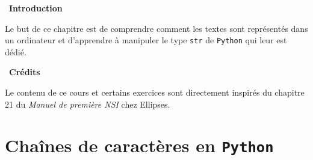 \documentclass[a4paper, french, 12pt]{article}  %
\newenvironment{introduction}
{\par \medskip    \noindent  
 \begin {bclogo}[couleur = blue!5 , arrondi =0.1,logo=\bcrosevents, marge=4] {~\textbf{Introduction}    }
 \par }
{
\end{bclogo}
 \par \bigskip }
\newcounter{cours}
\newenvironment{credit}
{\par \medskip   \noindent   
\begin{bclogo}[arrondi =0.1,  ombre = true, barre=zigzag, noborder = true, logo=\bcplume, marge=0]{~\textbf{Crédits} } \par \vspace{10pt}}
{ \itshape
\end{bclogo}
 \par \bigskip }
\begin{document}
\setlength{\parindent}{0cm}
\setlength{\columnseprule}{0cm}

\begin{center}
\end{center}

\vspace*{20pt}

\begin{introduction}{}
Le but de ce chapitre est de comprendre comment les textes sont représentés dans un ordinateur et d'apprendre à manipuler le type \lstinline{str} de \texttt{Python} qui leur est dédié.



\end{introduction}    

\vspace*{-20pt}

\begin{credit}

Le contenu de ce cours et certains exercices sont directement inspirés du chapitre 21 du  \emph{Manuel de première NSI} chez Ellipses.

\end{credit}

\vspace*{-20pt}

\section{Chaînes de caractères en \texttt{Python}}

\vspace*{-20pt}
\end{document}
